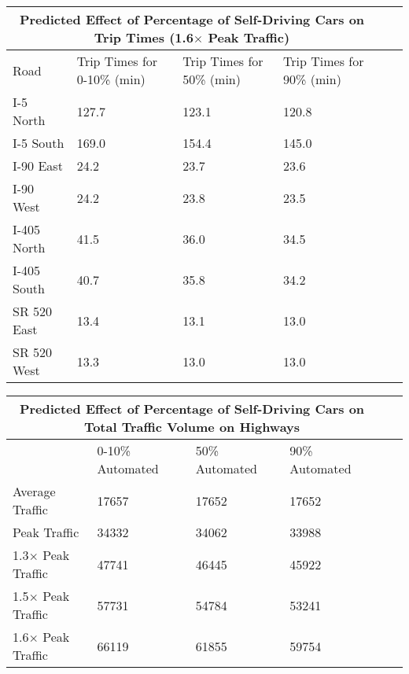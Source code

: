 \noindent \begin{tabular}{
|p{3cm}||p{3cm}|p{3cm}|p{3cm}|p{3cm}|p{3cm}|
}
 \hline
 \multicolumn{4}{|c|}{Predicted Effect of Percentage of Self-Driving Cars on Trip Times (1.6$\times$ Peak Traffic)} \\
 \hline
 Road & Trip Times for 0-10\% (min) & Trip Times for 50\% (min) & Trip Times for 90\% (min) \\
 \hline
 I-5 North    & 127.7  & 123.1  & 120.8 \\
 I-5 South    & 169.0  & 154.4  & 145.0 \\
 I-90 East    & 24.2 & 23.7 & 23.6  \\
 I-90 West    & 24.2  & 23.8 & 23.5   \\
 I-405 North  & 41.5 & 36.0 & 34.5   \\
 I-405 South  & 40.7  & 35.8 & 34.2   \\
 SR 520 East  & 13.4  & 13.1 & 13.0  \\
 SR 520 West  & 13.3  & 13.0 & 13.0  \\
 \hline
\end{tabular}

\bigskip

\noindent \begin{tabular}{
|p{4cm}||p{3cm}|p{3cm}|p{3cm}|p{3cm}|p{3cm}|
}
 \hline
 \multicolumn{4}{|c|}{Predicted Effect of Percentage of Self-Driving Cars on Total Traffic Volume on Highways} \\
 \hline
  & 0-10\% Automated & 50\% Automated & 90\% Automated \\
 \hline
 Average Traffic  & 17657 & 17652 & 17652 \\
 Peak Traffic    & 34332  & 34062   & 33988 \\
 1.3$\times$ Peak Traffic  & 47741 & 46445  & 45922  \\
 1.5$\times$ Peak Traffic  & 57731  & 54784 & 53241 \\
 1.6$\times$ Peak Traffic  & 66119  & 61855 & 59754 \\
 \hline
\end{tabular}
